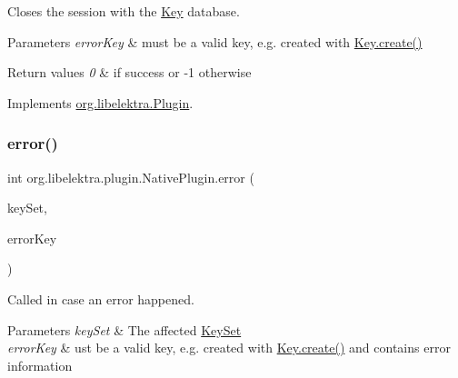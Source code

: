 Closes the session with the \mbox{\hyperlink{classorg_1_1libelektra_1_1Key}{Key}} database. 


\begin{DoxyParams}{Parameters}
{\em error\+Key} & must be a valid key, e.\+g. created with \mbox{\hyperlink{classorg_1_1libelektra_1_1Key_af407cf43625618af4e7fb2576037fcfc}{Key.\+create()}} \\
\hline
\end{DoxyParams}

\begin{DoxyRetVals}{Return values}
{\em 0} & if success or -\/1 otherwise \\
\hline
\end{DoxyRetVals}


Implements \mbox{\hyperlink{interfaceorg_1_1libelektra_1_1Plugin_aa5d4abf6ffd0d477d6972b13bed05d41}{org.\+libelektra.\+Plugin}}.

\mbox{\label{classorg_1_1libelektra_1_1plugin_1_1NativePlugin_a54c2753b1d17e14be39526a6ff02e34d}} 
\subsubsection{\texorpdfstring{error()}{error()}}
{\footnotesize\ttfamily int org.\+libelektra.\+plugin.\+Native\+Plugin.\+error (\begin{DoxyParamCaption}\item[{\mbox{\hyperlink{classorg_1_1libelektra_1_1KeySet}{Key\+Set}}}]{key\+Set,  }\item[{\mbox{\hyperlink{classorg_1_1libelektra_1_1Key}{Key}}}]{error\+Key }\end{DoxyParamCaption})\hspace{0.3cm}{\ttfamily [inline]}}



Called in case an error happened. 


\begin{DoxyParams}{Parameters}
{\em key\+Set} & The affected \mbox{\hyperlink{classorg_1_1libelektra_1_1KeySet}{Key\+Set}} \\
\hline
{\em error\+Key} & ust be a valid key, e.\+g. created with \mbox{\hyperlink{classorg_1_1libelektra_1_1Key_af407cf43625618af4e7fb2576037fcfc}{Key.\+create()}} and contains error information \\
\hline
\end{DoxyParams}

